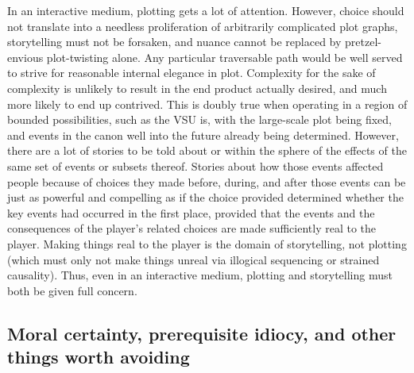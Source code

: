 In an interactive medium, plotting gets a lot of attention. However,
choice should not translate into a needless proliferation of
arbitrarily complicated plot graphs, storytelling must not be
forsaken, and nuance cannot be replaced by pretzel-envious
plot-twisting alone. Any particular traversable path would be well
served to strive for reasonable internal elegance in plot. Complexity
for the sake of complexity is unlikely to result in the end product
actually desired, and much more likely to end up contrived. This is
doubly true when operating in a region of bounded possibilities, such
as the VSU is, with the large-scale plot being fixed, and events in
the canon well into the future already being determined. However,
there are a lot of stories to be told about or within the sphere of
the effects of the same set of events or subsets thereof. Stories
about how those events affected people because of choices they made
before, during, and after those events can be just as powerful and
compelling as if the choice provided determined whether the key events
had occurred in the first place, provided that the events and the
consequences of the player's related choices are made sufficiently
real to the player. Making things real to the player is the domain of
storytelling, not plotting (which must only not make things unreal via
illogical sequencing or strained causality). Thus, even in an
interactive medium, plotting and storytelling must both be given full
concern.

\subsection{Moral certainty, prerequisite idiocy, and other things worth avoiding} 

